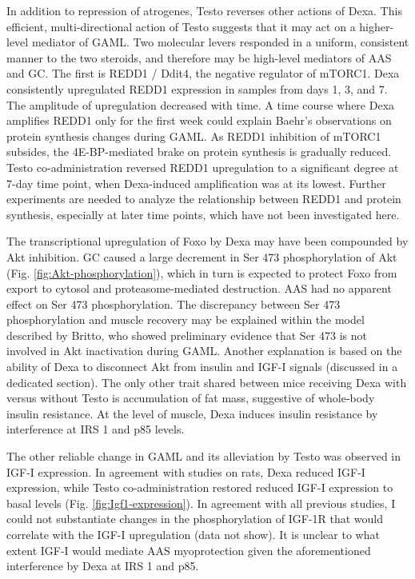 \documentclass[12pt,english]{report}\usepackage[]{graphicx}\usepackage[]{color}
\begin{document}
In addition to repression of atrogenes, Testo reverses other actions
of Dexa. This efficient, multi-directional action of Testo suggests
that it may act on a higher-level mediator of GAML. Two molecular
levers responded in a uniform, consistent manner to the two steroids,
and therefore may be high-level mediators of AAS and GC. The first
is REDD1 / Ddit4, the negative regulator of mTORC1. Dexa consistently
upregulated REDD1 expression in samples from days 1, 3, and 7. The
amplitude of upregulation decreased with time. A time course where
Dexa amplifies REDD1 only for the first week could explain Baehr's
observations on protein synthesis changes during GAML. As REDD1 inhibition
of mTORC1 subsides, the 4E-BP-mediated brake on protein synthesis
is gradually reduced. Testo co-administration reversed REDD1 upregulation
to a significant degree at 7-day time point, when Dexa-induced amplification
was at its lowest. Further experiments are needed to analyze the relationship
between REDD1 and protein synthesis, especially at later time points,
which have not been investigated here.

The transcriptional upregulation of Foxo by Dexa may have been compounded
by Akt inhibition. GC caused a large decrement in Ser 473 phosphorylation
of Akt (Fig. \ref{fig:Akt-phosphorylation}), which in turn is expected
to protect Foxo from export to cytosol and proteasome-mediated destruction.
AAS had no apparent effect on Ser 473 phosphorylation. The discrepancy
between Ser 473 phosphorylation and muscle recovery may be explained
within the model described by Britto\citep{britto2014redd1}, who
showed preliminary evidence that Ser 473 is not involved in Akt inactivation
during GAML. Another explanation is based on the ability of Dexa to
disconnect Akt from insulin and IGF-I signals (discussed in a dedicated
section). The only other trait shared between mice receiving Dexa
with versus without Testo is accumulation of fat mass, suggestive
of whole-body insulin resistance. At the level of muscle, Dexa induces
insulin resistance by interference at IRS 1 and p85 levels.

The other reliable change in GAML and its alleviation by Testo was
observed in IGF-I expression. In agreement with studies on rats, Dexa
reduced IGF-I expression, while Testo co-administration restored reduced
IGF-I expression to basal levels (Fig. \ref{fig:Igf1-expression}).
In agreement with all previous studies, I could not substantiate changes
in the phosphorylation of IGF-1R that would correlate with the IGF-I
upregulation (data not show). It is unclear to what extent IGF-I would
mediate AAS myoprotection given the aforementioned interference by
Dexa at IRS 1 and p85.
\end{document}
